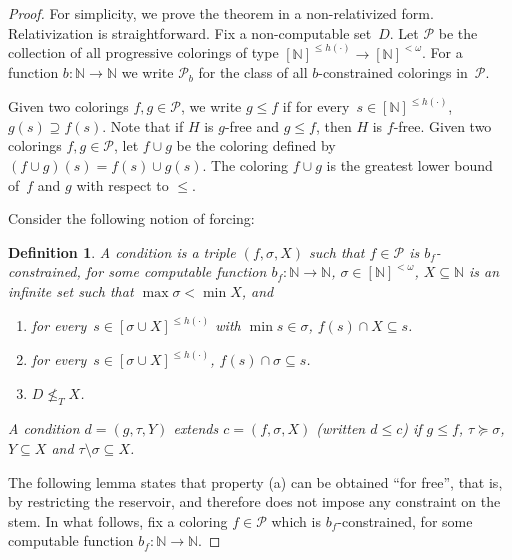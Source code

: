 \documentclass{article}
\def\P{\mathcal{P}}
\newcommand{\PFS}[0]{\mathsf{PFS}}
\newcommand{\NN}[0]{\mathbb{N}}
\def\qt#1{``#1''}%
\newtheorem{theorem}{Theorem}
\numberwithin{theorem}{section}
\newtheorem{definition}[theorem]{Definition}
\begin{document}
\begin{proof}
For simplicity, we prove the theorem in a non-relativized form. Relativization is straightforward.
Fix a non-computable set~$D$. 
Let $\P$ be the collection of all progressive colorings of type $[\NN]^{\leq h(\cdot)} \to [\NN]^{<\omega}$. For a function $b:\NN\to\NN$ we write $\P_b$ for the class of all $b$-constrained colorings in~$\P$.

Given two colorings $f, g \in \P$, we write $g \leq f$ if for every~$s \in [\NN]^{\leq h(\cdot)}$, $g(s) \supseteq f(s)$.
Note that if $H$ is $g$-free and $g \leq f$, then $H$ is $f$-free.
Given two colorings $f, g \in \P$, let $f \cup g$ be the coloring defined by $(f \cup g)(s) = f(s) \cup g(s)$. The coloring $f \cup g$ is the greatest lower bound of~$f$ and $g$ with respect to $\leq$.


Consider the following notion of forcing:

\begin{definition}
A \emph{condition} is a triple $(f, \sigma, X)$ such that
$f \in \P$ is $b_f$-constrained, for some computable function $b_f : \NN \to \NN$,
$\sigma \in [\NN]^{<\omega}$, $X \subseteq \NN$ is an infinite set such that $\max \sigma < \min X$, and
\begin{enumerate}
    \item[(a)] for every~$s \in [\sigma \cup X]^{\leq h(\cdot)}$ with $\min s \in \sigma$, $f(s) \cap X \subseteq s$.
    \item[(b)] for every~$s \in [\sigma \cup X]^{\leq h(\cdot)}$, $f(s) \cap \sigma \subseteq s$.
    \item[(c)] $D \not \leq_T X$.
\end{enumerate}
A condition $d = (g, \tau, Y)$ \emph{extends} $c = (f, \sigma, X)$ (written $d \leq c$) if
$g \leq f$, $\tau \succeq \sigma$, $Y \subseteq X$ and $\tau \setminus \sigma \subseteq X$.
\end{definition}

The following lemma states that property (a) can be obtained \qt{for free}, that is, by restricting the reservoir, and therefore does not impose any constraint on the stem.
In what follows, fix a coloring $f \in \P$ which is $b_f$-constrained, for some computable function $b_f : \NN \to \NN$.


\end{proof}
\end{document}
